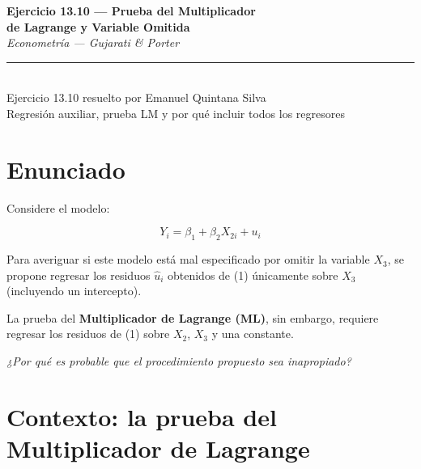 \documentclass[12pt,letterpaper]{article}
\begin{document}

\begin{center}

{\LARGE\bfseries Ejercicio 13.10 --- Prueba del Multiplicador}\\[4pt]

{\LARGE\bfseries de Lagrange y Variable Omitida}\\[12pt]

{\large\itshape Econometría --- Gujarati \& Porter}\\[10pt]

\rule{0.55\linewidth}{0.6pt}\\[10pt]

{\normalsize
Ejercicio 13.10 resuelto por Emanuel Quintana Silva}\\[4pt]

{\small
Regresión auxiliar, prueba LM y por qué incluir todos los regresores}

\end{center}

\vspace{12pt}

\section{Enunciado}

Considere el modelo:

\begin{equation}
Y_{i} = \beta_{1} + \beta_{2} X_{2i} + u_{i}
\end{equation}

Para averiguar si este modelo está mal especificado por omitir la
variable $X_{3}$, se propone regresar los residuos $\hat{u}_{i}$
obtenidos de (1) únicamente sobre $X_{3}$ (incluyendo un intercepto).

La prueba del \textbf{Multiplicador de Lagrange (ML)}, sin embargo,
requiere regresar los residuos de (1) sobre $X_{2}$, $X_{3}$ y una
constante.

\bigskip

\noindent\textit{¿Por qué es probable que el procedimiento propuesto
sea inapropiado?}

\section{Contexto: la prueba del Multiplicador de Lagrange}
\end{document}

